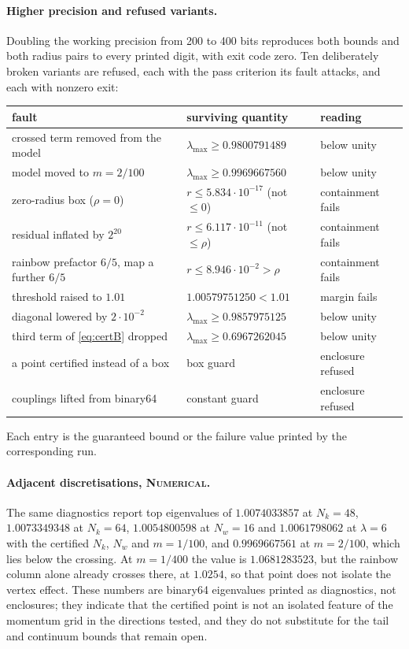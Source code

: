 \documentclass[11pt]{article}
\newcommand{\NUM}{\upshape\mdseries\textsc{Numerical}}
\theoremstyle{definition}
\theoremstyle{remark}
\begin{document}
\paragraph{Higher precision and refused variants.} Doubling the working precision from 200 to 400 bits reproduces both bounds and both radius pairs to every printed digit, with exit code zero. Ten deliberately broken variants are refused, each with the pass criterion its fault attacks, and each with nonzero exit:
\begin{center}
\small
\begin{tabular}{@{}>{\raggedright\arraybackslash}p{4.6cm}ll@{}}
\hline
fault & surviving quantity & reading \\
\hline
crossed term removed from the model & $\lambda_{\max}\ge0.9800791489$ & below unity \\
model moved to $m=2/100$ & $\lambda_{\max}\ge0.9969667560$ & below unity \\
zero-radius box ($\rho=0$) & $r\le5.834\cdot10^{-17}$ (not $\le0$) & containment fails \\
residual inflated by $2^{20}$ & $r\le6.117\cdot10^{-11}$ (not $\le\rho$) & containment fails \\
rainbow prefactor $6/5$, map a further $6/5$ & $r\le8.946\cdot10^{-2}>\rho$ & containment fails \\
threshold raised to $1.01$ & $1.00579751250<1.01$ & margin fails \\
diagonal lowered by $2\cdot10^{-2}$ & $\lambda_{\max}\ge0.9857975125$ & below unity \\
third term of \eqref{eq:certB} dropped & $\lambda_{\max}\ge0.6967262045$ & below unity \\
a point certified instead of a box & box guard & enclosure refused \\
couplings lifted from binary64 & constant guard & enclosure refused \\
\hline
\end{tabular}
\end{center}
Each entry is the guaranteed bound or the failure value printed by the corresponding run.

\paragraph{Adjacent discretisations, \NUM.} The same diagnostics report top eigenvalues of $1.0074033857$ at $N_k=48$, $1.0073349348$ at $N_k=64$, $1.0054800598$ at $N_w=16$ and $1.0061798062$ at $\lambda=6$ with the certified $N_k$, $N_w$ and $m=1/100$, and $0.9969667561$ at $m=2/100$, which lies below the crossing. At $m=1/400$ the value is $1.0681283523$, but the rainbow column alone already crosses there, at $1.0254$, so that point does not isolate the vertex effect. These numbers are binary64 eigenvalues printed as diagnostics, not enclosures; they indicate that the certified point is not an isolated feature of the momentum grid in the directions tested, and they do not substitute for the tail and continuum bounds that remain open.
\end{document}
